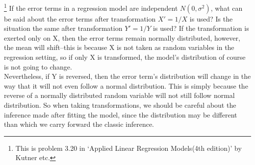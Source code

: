 \documentclass[12pt]{article}
\begin{document}
 {\footnote[3]{This is
problem 3.20 in `Applied Linear Regression Models(4th edition)' by
Kutner etc.} 
 If the error terms in a regression model are independent $N(0,\sigma^2)$, what can be said about the error terms after transformation $X'=1/X$ is used? Is the situation the same after transformation $Y'=1/Y$ is used?
} { \vfill
  \answer
} { If the transformation is exerted only on X, then the error terms
remain normally distributed, however, the mean will shift--this is
because X is not taken as random variables in the regression
setting, so if only X is transformed, the model's distribution of
course is not going to change.\\
Nevertheless, if Y is reversed, then the error term's distribution
will change in the way that it will not even follow a normal
distribution. This is simply because the reverse of a normally
distributed random variable will not still follow normal
distribution. So when taking transformations, we should be careful
about the inference made after fitting the model, since the
distribution may be different than which we carry forward the
classic inference.}



\problemsdone
\end{document}
